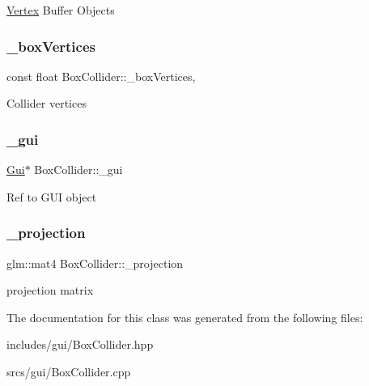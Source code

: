 \hyperlink{struct_vertex}{Vertex} Buffer Objects \mbox{\label{class_box_collider_a8fc69f37cbd732dfc24a2e97f92f161e}} 
\subsubsection{\texorpdfstring{\+\_\+box\+Vertices}{\_boxVertices}}
{\footnotesize\ttfamily const float Box\+Collider\+::\+\_\+box\+Vertices\hspace{0.3cm}{\ttfamily [static]}, {\ttfamily [protected]}}

Collider vertices \mbox{\label{class_box_collider_a79878a3379cc1710aec75057373dc3d1}} 
\subsubsection{\texorpdfstring{\+\_\+gui}{\_gui}}
{\footnotesize\ttfamily \hyperlink{class_gui}{Gui}$\ast$ Box\+Collider\+::\+\_\+gui\hspace{0.3cm}{\ttfamily [protected]}}

Ref to G\+UI object \mbox{\label{class_box_collider_a1eb52f9eec4a732c48b12c074ce23c29}} 
\subsubsection{\texorpdfstring{\+\_\+projection}{\_projection}}
{\footnotesize\ttfamily glm\+::mat4 Box\+Collider\+::\+\_\+projection\hspace{0.3cm}{\ttfamily [protected]}}

projection matrix 

The documentation for this class was generated from the following files\+:\begin{DoxyCompactItemize}
\item 
includes/gui/Box\+Collider.\+hpp\item 
srcs/gui/Box\+Collider.\+cpp\end{DoxyCompactItemize}
